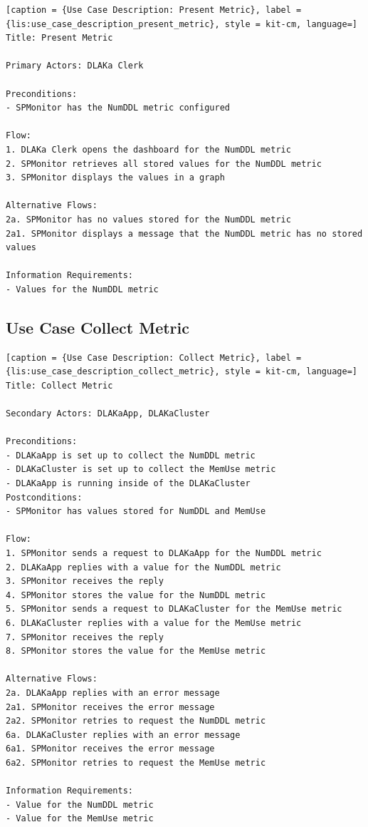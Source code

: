 \begin{lstlisting}[caption = {Use Case Description: Present Metric}, label = {lis:use_case_description_present_metric}, style = kit-cm, language=]
Title: Present Metric

Primary Actors: DLAKa Clerk

Preconditions:
- SPMonitor has the NumDDL metric configured

Flow:
1. DLAKa Clerk opens the dashboard for the NumDDL metric
2. SPMonitor retrieves all stored values for the NumDDL metric
3. SPMonitor displays the values in a graph

Alternative Flows:
2a. SPMonitor has no values stored for the NumDDL metric
2a1. SPMonitor displays a message that the NumDDL metric has no stored values

Information Requirements:
- Values for the NumDDL metric
\end{lstlisting}

\subsection{Use Case Collect Metric}

\begin{lstlisting}[caption = {Use Case Description: Collect Metric}, label = {lis:use_case_description_collect_metric}, style = kit-cm, language=]
Title: Collect Metric

Secondary Actors: DLAKaApp, DLAKaCluster

Preconditions:
- DLAKaApp is set up to collect the NumDDL metric
- DLAKaCluster is set up to collect the MemUse metric
- DLAKaApp is running inside of the DLAKaCluster
Postconditions:
- SPMonitor has values stored for NumDDL and MemUse

Flow:
1. SPMonitor sends a request to DLAKaApp for the NumDDL metric
2. DLAKaApp replies with a value for the NumDDL metric
3. SPMonitor receives the reply
4. SPMonitor stores the value for the NumDDL metric
5. SPMonitor sends a request to DLAKaCluster for the MemUse metric
6. DLAKaCluster replies with a value for the MemUse metric
7. SPMonitor receives the reply
8. SPMonitor stores the value for the MemUse metric

Alternative Flows:
2a. DLAKaApp replies with an error message
2a1. SPMonitor receives the error message
2a2. SPMonitor retries to request the NumDDL metric
6a. DLAKaCluster replies with an error message
6a1. SPMonitor receives the error message
6a2. SPMonitor retries to request the MemUse metric

Information Requirements:
- Value for the NumDDL metric
- Value for the MemUse metric
\end{lstlisting}

